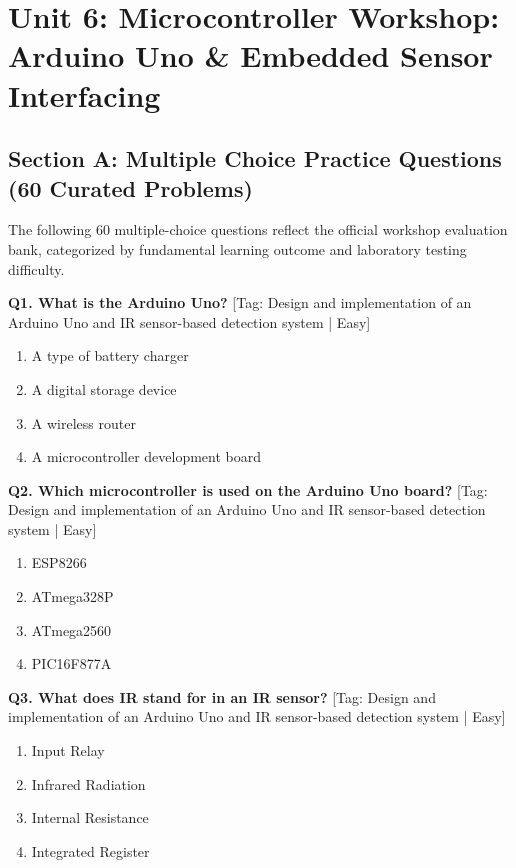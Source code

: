 \chapter{Unit 6: Microcontroller Workshop: Arduino Uno \& Embedded Sensor Interfacing}

\section{Section A: Multiple Choice Practice Questions (60 Curated Problems)}

\noindent The following 60 multiple-choice questions reflect the official workshop evaluation bank, categorized by fundamental learning outcome and laboratory testing difficulty.\vspace{3mm}

\noindent\textbf{Q1. What is the Arduino Uno?} \hfill [Tag: Design and implementation of an Arduino Uno and IR sensor-based detection system | Easy]
\begin{enumerate}[label=(\alph*),topsep=2pt,itemsep=1pt,partopsep=0pt,parsep=0pt]
    \item {A type of battery charger}
    \item {A digital storage device}
    \item {A wireless router}
    \item {A microcontroller development board}
\end{enumerate}
\vspace{2mm}

\noindent\textbf{Q2. Which microcontroller is used on the Arduino Uno board?} \hfill [Tag: Design and implementation of an Arduino Uno and IR sensor-based detection system | Easy]
\begin{enumerate}[label=(\alph*),topsep=2pt,itemsep=1pt,partopsep=0pt,parsep=0pt]
    \item {ESP8266}
    \item {ATmega328P}
    \item {ATmega2560}
    \item {PIC16F877A}
\end{enumerate}
\vspace{2mm}

\noindent\textbf{Q3. What does IR stand for in an IR sensor?} \hfill [Tag: Design and implementation of an Arduino Uno and IR sensor-based detection system | Easy]
\begin{enumerate}[label=(\alph*),topsep=2pt,itemsep=1pt,partopsep=0pt,parsep=0pt]
    \item {Input Relay}
    \item {Infrared Radiation}
    \item {Internal Resistance}
    \item {Integrated Register}
\end{enumerate}
\vspace{2mm}

